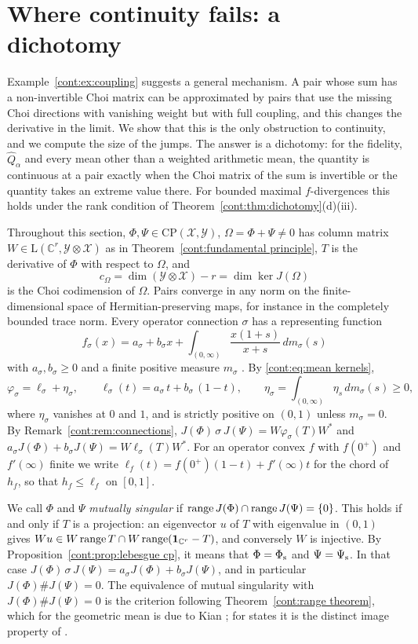 \section{Where continuity fails: a dichotomy}\label{cont:sec:dichotomy}

Example~\ref{cont:ex:coupling} suggests a general mechanism. A pair whose sum has a non-invertible Choi matrix can be approximated by pairs that use the missing Choi directions with vanishing weight but with full coupling, and this changes the derivative in the limit. We show that this is the only obstruction to continuity, and we compute the size of the jumps. The answer is a dichotomy: for the fidelity, $\widehat{Q}_\alpha$ and every mean other than a weighted arithmetic mean, the quantity is continuous at a pair exactly when the Choi matrix of the sum is invertible or the quantity takes an extreme value there. For bounded maximal $f$-divergences this holds under the rank condition of Theorem~\ref{cont:thm:dichotomy}(d)(iii).

Throughout this section, $\Phi,\Psi\in\mathrm{CP}(\mathcal{X},\mathcal{Y})$, $\Omega=\Phi+\Psi\neq0$ has column matrix $W\in\mathrm{L}(\mathbb{C}^r,\mathcal{Y}\otimes\mathcal{X})$ as in Theorem~\ref{cont:fundamental principle}, $T$ is the derivative of $\Phi$ with respect to $\Omega$, and
\[
c_\Omega=\dim(\mathcal{Y}\otimes\mathcal{X})-r=\dim\ker J(\Omega)
\]
is the Choi codimension of $\Omega$. Pairs converge in any norm on the finite-dimensional space of Hermitian-preserving maps, for instance in the completely bounded trace norm. Every operator connection $\sigma$ has a representing function
\[
f_\sigma(x)=a_\sigma+b_\sigma x+\int_{(0,\infty)}\frac{x(1+s)}{x+s}\,dm_\sigma(s)
\]
with $a_\sigma,b_\sigma\geq0$ and a finite positive measure $m_\sigma$ \cite{KuboAndo1980}. By \eqref{cont:eq:mean kernels},
\[
\varphi_\sigma=\ell_\sigma+\eta_\sigma,\qquad\ell_\sigma(t)=a_\sigma\,t+b_\sigma\,(1-t),\qquad\eta_\sigma=\int_{(0,\infty)}\eta_s\,dm_\sigma(s)\geq0,
\]
where $\eta_\sigma$ vanishes at $0$ and $1$, and is strictly positive on $(0,1)$ unless $m_\sigma=0$. By Remark~\ref{cont:rem:connections}, $J(\Phi)\,\sigma\,J(\Psi)=W\varphi_\sigma(T)W^*$ and $a_\sigma J(\Phi)+b_\sigma J(\Psi)=W\ell_\sigma(T)W^*$. For an operator convex $f$ with $f(0^+)$ and $f'(\infty)$ finite we write $\ell_f(t)=f(0^+)(1-t)+f'(\infty)t$ for the chord of $h_f$, so that $h_f\leq\ell_f$ on $[0,1]$.

We call $\Phi$ and $\Psi$ \emph{mutually singular} if $\operatorname{range} J(\Phi)\cap\operatorname{range} J(\Psi)=\{0\}$. This holds if and only if $T$ is a projection: an eigenvector $u$ of $T$ with eigenvalue in $(0,1)$ gives $Wu\in W\operatorname{range} T\cap W\operatorname{range}(\mathbf{1}_{\mathbb{C}^r}-T)$, and conversely $W$ is injective. By Proposition~\ref{cont:prop:lebesgue cp}, it means that $\Phi=\Phi_{\rm s}$ and $\Psi=\Psi_{\rm s}$. In that case $J(\Phi)\,\sigma\,J(\Psi)=a_\sigma J(\Phi)+b_\sigma J(\Psi)$, and in particular $J(\Phi)\#J(\Psi)=0$. The equivalence of mutual singularity with $J(\Phi)\#J(\Psi)=0$ is the criterion following Theorem~\ref{cont:range theorem}, which for the geometric mean is due to Kian \cite[Theorem~4.3]{kian2026relative}; for states it is the distinct image property of \cite{cree2020fidelity}.

